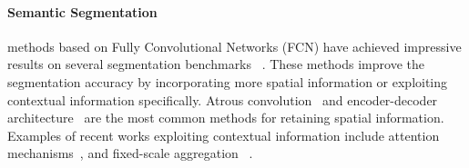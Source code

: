\paragraph{Semantic Segmentation} methods based on Fully Convolutional Networks (FCN)
\citep{long2015fcn,sermanet2014overfeat} have achieved impressive results on several segmentation
benchmarks ~\citep{everingham2015pascalvoc,
    cordts2016cityscapes,zhou2017adedataset,caesar2018cocoostuff}. These methods improve the
segmentation accuracy by incorporating more spatial information or exploiting contextual information
specifically. Atrous convolution~\citep{chen2018deeplab,mehta2018espnet} and encoder-decoder
architecture~\citep{ronneberger2015UNet,noh2015deconvolution,badrinarayanan2017segnet} are the most
common methods for retaining spatial information. Examples of recent works exploiting contextual
information include attention
mechanisms~\citep{yuan2018ocnet,zhao2018psanet,fu2019DANet,huang2019CCNet,yuan2020ocr,tao2020HRNet,zhang2020resnest},
and fixed-scale aggregation
~\citep{zhao2017PSPNet,chen2018deeplab,chen2018ZPSA,zhang2018ContextEncoding}.

